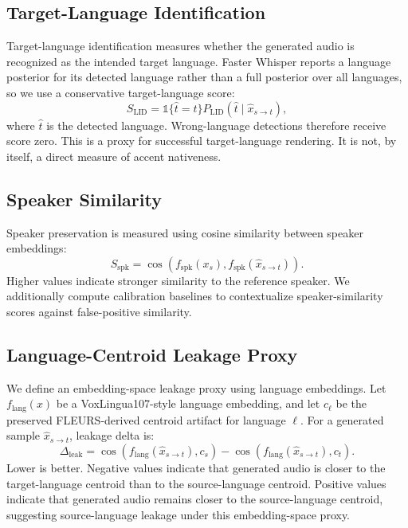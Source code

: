 \documentclass[11pt]{article}
\newcommand{\leakdelta}{\Delta_{\mathrm{leak}}}
\begin{document}
\subsection{Target-Language Identification}

Target-language identification measures whether the generated audio is recognized as the intended target language. Faster Whisper reports a language posterior for its detected language rather than a full posterior over all languages, so we use a conservative target-language score:
\begin{equation}
    S_{\mathrm{LID}} =
    \mathbb{1}\{\hat{t}=t\}
    P_{\mathrm{LID}}(\hat{t} \mid \hat{x}_{s\rightarrow t}),
\end{equation}
where $\hat{t}$ is the detected language. Wrong-language detections therefore receive score zero. This is a proxy for successful target-language rendering. It is not, by itself, a direct measure of accent nativeness.

\subsection{Speaker Similarity}

Speaker preservation is measured using cosine similarity between speaker embeddings:
\begin{equation}
    S_{\mathrm{spk}} =
    \cos\left(f_{\mathrm{spk}}(x_s), f_{\mathrm{spk}}(\hat{x}_{s\rightarrow t})\right).
\end{equation}
Higher values indicate stronger similarity to the reference speaker. We additionally compute calibration baselines to contextualize speaker-similarity scores against false-positive similarity.

\subsection{Language-Centroid Leakage Proxy}

We define an embedding-space leakage proxy using language embeddings. Let $f_{\mathrm{lang}}(x)$ be a VoxLingua107-style language embedding, and let $c_\ell$ be the preserved FLEURS-derived centroid artifact for language $\ell$. For a generated sample $\hat{x}_{s\rightarrow t}$, leakage delta is:
\begin{equation}
    \leakdelta =
    \cos\left(f_{\mathrm{lang}}(\hat{x}_{s\rightarrow t}), c_s\right)
    -
    \cos\left(f_{\mathrm{lang}}(\hat{x}_{s\rightarrow t}), c_t\right).
\end{equation}
Lower is better. Negative values indicate that generated audio is closer to the target-language centroid than to the source-language centroid. Positive values indicate that generated audio remains closer to the source-language centroid, suggesting source-language leakage under this embedding-space proxy.
\end{document}
